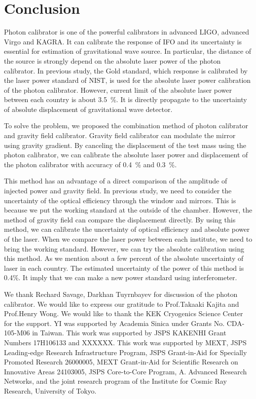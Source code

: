 \documentclass[A4]{spie}  %
\begin{document}
\section{Conclusion}
Photon calibrator is one of the powerful calibrators in advanced LIGO, advanced Virgo and KAGRA. It can calibrate the response of IFO and its uncertainty is essential for estimation of gravitational wave source. In particular, the distance of the source is strongly depend on the absolute laser power of the photon calibrator. In previous study, the Gold standard, which response is calibrated by the laser power standard of NIST, is used for the absolute laser power calibration of the photon calibrator. However, current limit of the absolute laser power between each country is about 3.5~\%. It is directly propagate to the uncertainty of absolute displacement of gravitational wave detector.

To solve the problem, we proposed the combination method of photon calibrator and gravity field calibrator. Gravity field calibrator can modulate the mirror using gravity gradient. By canceling the displacement of the test mass using the photon calibrator, we can calibrate the absolute laser power and displacement of the photon calibrator with accuracy of 0.4~\% and 0.3~\%.

This method has an advantage of a direct comparison of the amplitude of injected power and gravity field. In previous study, we need to consider the uncertainty of the optical efficiency through the window and mirrors. This is because we put the working standard at the outside of the chamber. However, the method of gravity field can compare the displacement directly. By using this method, we can calibrate the uncertainty of optical efficiency and absolute power of the laser. When we compare the laser power between each institute, we need to bring the working standard. However, we can try the absolute calibration using this method. As we mention about a few percent of the absolute uncertainty of laser in each country. The estimated uncertainty of the power of this method is 0.4\%. It imply that we can make a new power standard using interferometer.
\acknowledgments     %
 
We thank Rechard Savage, Darkhan Tuyrnbayev for discussion of the photon calibrator. We would like to express our gratitude to Prof.Takaaki Kajita and Prof.Henry Wong. We would like to thank the KEK Cryogenics Science Center for the support. YI was supported by Academia Sinica under Grants No. CDA-105-M06 in Taiwan. This work was supported by JSPS KAKENHI Grant Numbers 17H106133 and XXXXXX. This work was supported by MEXT, JSPS Leading-edge Research Infrastructure Program, JSPS Grant-in-Aid for Specially Promoted
Research 26000005, MEXT Grant-in-Aid for Scientific Research on
Innovative Areas 24103005, JSPS Core-to-Core Program, A. Advanced
Research Networks, and the joint research program of the Institute for
Cosmic Ray Research, University of Tokyo.


\end{document}
